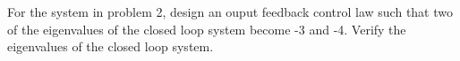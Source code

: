 \item For the system in problem 2, design an ouput feedback control law such that two of the eigenvalues of the
  closed loop system become -3 and -4. Verify the eigenvalues of the closed loop system.